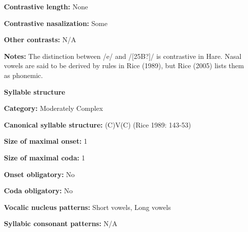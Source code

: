 \begin{styleBody}
\textbf{Contrastive length:} None
\end{styleBody}

\begin{styleBody}
\textbf{Contrastive nasalization:} Some
\end{styleBody}

\begin{styleBody}
\textbf{Other contrasts:} N/A
\end{styleBody}

\begin{styleBody}
\textbf{Notes:} The distinction between /e/ and /[25B?]/ is contrastive in Hare. Nasal vowels are said to be derived by rules in Rice (1989), but Rice (2005) lists them as phonemic.
\end{styleBody}

\begin{styleBody}
\textbf{Syllable structure}
\end{styleBody}

\begin{styleBody}
\textbf{Category: }Moderately Complex
\end{styleBody}

\begin{styleBody}
\textbf{Canonical syllable structure: }(C)V(C) (Rice 1989: 143-53)
\end{styleBody}

\begin{styleBody}
\textbf{Size of maximal onset:} 1
\end{styleBody}

\begin{styleBody}
\textbf{Size of maximal coda:} 1
\end{styleBody}

\begin{styleBody}
\textbf{Onset obligatory:} No
\end{styleBody}

\begin{styleBody}
\textbf{Coda obligatory:} No
\end{styleBody}

\begin{styleBody}
\textbf{Vocalic nucleus patterns:} Short vowels, Long vowels
\end{styleBody}

\begin{styleBody}
\textbf{Syllabic consonant patterns:} N/A
\end{styleBody}

